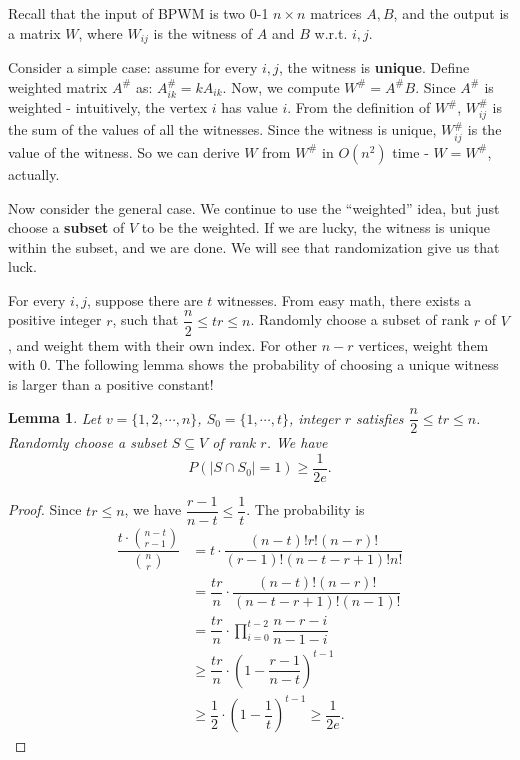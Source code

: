 \documentclass[11pt]{article}
\theoremstyle{plain}
\newtheorem{lemma}{Lemma}[section]
\begin{document}
Recall that the input of BPWM is two 0-1 $n\times n$ matrices $A,B$, and the output is a matrix $W$, where $W_{ij}$ is the witness of $A$ and $B$ w.r.t. $i,j$.

Consider a simple case: assume for every $i,j$, the witness is \textbf{unique}. Define weighted matrix $A^{\#}$ as: $A^{\#}_{ik}=kA_{ik}$. Now, we compute $W^{\#}=A^{\#}B$. Since $A^{\#}$ is weighted - intuitively, the vertex $i$ has value $i$. From the definition of $W^{\#}$, $W^{\#}_{ij}$ is the sum of the values of all the witnesses. Since the witness is unique, $W^{\#}_{ij}$ is the value of the witness. So we can derive $W$ from $W^{\#}$ in $O(n^2)$ time - $W=W^{\#}$, actually.

Now consider the general case. We continue to use the ``weighted'' idea, but just choose a \textbf{subset} of $V$ to be the weighted. If we are lucky, the witness is unique within the subset, and we are done. We will see that randomization give us that luck.

For every $i,j$, suppose there are $t$ witnesses. From easy math, there exists a positive integer $r$, such that $\dfrac{n}{2}\le tr\le n$. Randomly choose a subset of rank $r$ of $V$, and weight them with their own index. For other $n-r$ vertices, weight them with $0$. The following lemma shows the probability of choosing a unique witness is larger than a positive constant!

\begin{lemma}
\label{6}
Let $v=\{1,2,\cdots,n\}$, $S_0=\{1,\cdots,t\}$, integer $r$ satisfies $\dfrac{n}{2}\le tr\le n$. Randomly choose a subset $S\subseteq V$ of rank $r$. We have
$$P(|S\cap S_0|=1)\ge \dfrac{1}{2e}.$$
\end{lemma}
\begin{proof}
Since $tr\le n$, we have $\dfrac{r-1}{n-t}\le \dfrac{1}{t}$. The probability is
\begin{align*}
\dfrac{t\cdot \binom{n-t}{r-1}}{\binom{n}{r}} &= t\cdot \dfrac{(n-t)!r!(n-r)!}{(r-1)!(n-t-r+1)!n!}\\
&= \dfrac{tr}{n}\cdot \dfrac{(n-t)!(n-r)!}{(n-t-r+1)!(n-1)!}\\
&= \dfrac{tr}{n}\cdot \prod\limits_{i=0}^{t-2} \dfrac{n-r-i}{n-1-i}\\
&\ge \dfrac{tr}{n}\cdot \left(1-\dfrac{r-1}{n-t}\right)^{t-1}\\
&\ge \dfrac{1}{2}\cdot \left(1-\dfrac{1}{t}\right)^{t-1} \ge \dfrac{1}{2e}.
\end{align*}
\end{proof}
\end{document}
